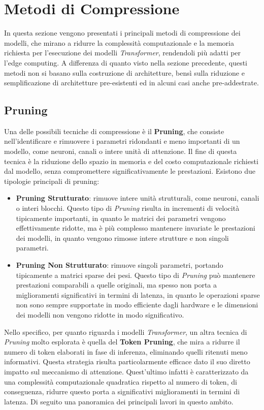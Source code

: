 \section{Metodi di Compressione}
In questa sezione vengono presentati i principali metodi di compressione dei
modelli, che mirano a ridurre la complessità computazionale e la memoria
richiesta per l'esecuzione dei modelli \textit{Transformer}, rendendoli più
adatti per l'edge computing. A differenza di quanto visto nella sezione
precedente, questi metodi non si basano sulla costruzione di architetture,
bensì sulla riduzione e semplificazione di architetture pre-esistenti ed in
alcuni casi anche pre-addestrate.
\subsection{Pruning}
Una delle possibili tecniche di compressione è il \textbf{Pruning}, che
consiste nell'identificare e rimuovere i parametri ridondanti e meno importanti
di un modello, come neuroni, canali o intere unità di attenzione. Il fine di
questa tecnica è la riduzione dello spazio in memoria e del costo
computazionale richiesti dal modello, senza compromettere significativamente le
prestazioni. Esistono due tipologie principali di pruning:
\begin{itemize}
    \item \textbf{Pruning Strutturato}: rimuove intere unità strutturali, come neuroni, canali o interi blocchi. Questo tipo di \textit{Pruning} risulta in incrementi di velocità tipicamente importanti, in quanto le matrici dei parametri vengono effettivamente ridotte, ma è più complesso mantenere invariate le prestazioni dei modelli, in quanto vengono rimosse intere strutture e non singoli parametri.
    \item \textbf{Pruning Non Strutturato}: rimuove singoli parametri, portando tipicamente a matrici sparse dei pesi. Questo tipo di \textit{Pruning} può mantenere prestazioni comparabili a quelle originali, ma spesso non porta a miglioramenti significativi in termini di latenza, in quanto le operazioni sparse non sono sempre supportate in modo efficiente dagli hardware e le dimensioni dei modelli non vengono ridotte in modo significativo.
\end{itemize}
Nello specifico, per quanto riguarda i modelli \textit{Transformer}, un altra tecnica di \textit{Pruning} molto esplorata è quella del \textbf{Token Pruning}, che mira a ridurre il numero di token elaborati in fase di inferenza, eliminando quelli ritenuti meno informativi.
Questa strategia risulta particolarmente efficace dato il suo diretto impatto sul meccanismo di attenzione. Quest'ultimo infatti è caratterizzato da una complessità computazionale quadratica rispetto al numero di token, di conseguenza, ridurre questo porta a significativi miglioramenti in termini di latenza. Di seguito una panoramica dei principali lavori in questo ambito.

